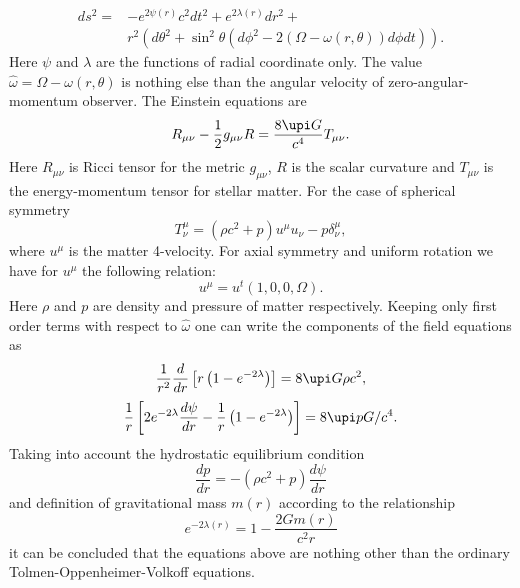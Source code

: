 \documentclass[fleqn,usenatbib]{mnras}
\begin{document}
\begin{equation}
	\begin{aligned}
    ds^2= & - e^{2\psi(r)}c^{2}dt^2 + e^{2\lambda(r)}dr^2 + \\
		  & r^2\left(d\theta^2+\sin^{2}\theta\left(d\phi^{2}-2(\Omega-\omega(r,\theta))d\phi dt\right)\right).
    \end{aligned}
\end{equation}
Here $\psi$ and $\lambda$ are the functions of radial coordinate only.
The value $\hat{\omega}=\Omega-\omega(r,\theta)$ is nothing else
than the angular velocity of zero-angular-momentum observer. The
Einstein equations are
\begin{equation}
    R_{\mu\nu}-\frac{1}{2}g_{\mu\nu}R=\frac{8\upi G}{c^4}T_{\mu\nu}.
\end{equation}
Here $R_{\mu\nu}$ is Ricci tensor for the metric $g_{\mu\nu}$, $R$ is
the scalar curvature and $T_{\mu\nu}$ is the energy-momentum tensor for
stellar matter. For the case of spherical symmetry
\begin{equation}
    T^{\mu}_{\nu}=(\rho c^2+p)u^{\mu}u_{\nu}-p\delta^{\mu}_{\nu},
\end{equation}
where $u^{\mu}$ is the matter 4-velocity. For axial symmetry and
uniform rotation we have for $u^{\mu}$ the following relation:
\begin{equation}
    u^{\mu}=u^{t}(1,0,0,\Omega).
\end{equation}
Here $\rho$ and $p$ are density and pressure of matter
respectively. Keeping only first order terms with respect to
$\hat{\omega}$ one can write the components of the field equations as
\begin{equation}
 \label{TOV1-1}
 \frac{1}{r^2}\frac{d}{dr}\left[ r\left(1-e^{-2\lambda }\right)\right] = 8\upi G \rho \/c^{2},
\end{equation}
\begin{equation}
 \label{TOV2-1}
 \frac{1}{r} \left[2e^{-2\lambda}\frac{d\psi}{dr}-\frac{1}{r}\left(1-e^{-2\lambda}\right)\right] = 8\upi p G/c^4.
\end{equation}
Taking into account the hydrostatic equilibrium condition
\begin{equation}
    \label{hydro-1}
    \frac{dp}{dr}=-(\rho c^2+p)\frac{d\psi}{dr}
\end{equation}
and definition of gravitational mass $m(r)$ according to the relationship
\begin{equation}
    e^{-2\lambda(r)}=1-\frac{2G m(r)}{c^2 r}
\end{equation}
it can be concluded that the equations above are nothing other than
the ordinary Tolmen-Oppenheimer-Volkoff equations.
\end{document}
